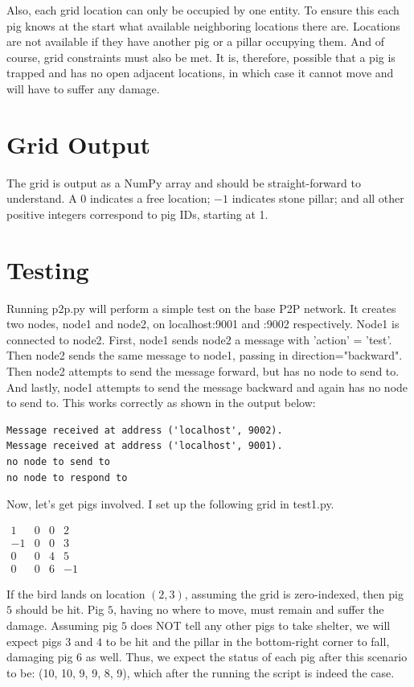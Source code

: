 \documentclass[]{article}
\begin{document}
Also, each grid location can only be occupied by one entity. To ensure this each pig knows at the start what available neighboring locations there are. Locations are not available if they have another pig or a pillar occupying them. And of course, grid constraints must also be met. It is, therefore, possible that a pig is trapped and has no open adjacent locations, in which case it cannot move and will have to suffer any damage.

\section{Grid Output}

The grid is output as a NumPy array and should be straight-forward to understand. A $0$ indicates a free location; $-1$ indicates stone pillar; and all other positive integers correspond to pig IDs, starting at 1.

\section{Testing}

Running p2p.py will perform a simple test on the base P2P network. It creates two nodes, node1 and node2, on localhost:9001 and :9002 respectively. Node1 is connected to node2. First, node1 sends node2 a message with 'action' = 'test'. Then node2 sends the same message to node1, passing in direction="backward". Then node2 attempts to send the message forward, but has no node to send to. And lastly, node1 attempts to send the message backward and again has no node to send to. This works correctly as shown in the output below:

\begin{lstlisting}
Message received at address ('localhost', 9002).
Message received at address ('localhost', 9001).
no node to send to
no node to respond to
\end{lstlisting}

Now, let's get pigs involved. I set up the following grid in test1.py.

$\begin{array}{cccc}
1 & 0 & 0 & 2 \\
-1 & 0 & 0 & 3 \\
0 & 0 & 4 & 5 \\
0 & 0 & 6 & -1
\end{array}$
 
If the bird lands on location $(2,3)$, assuming the grid is zero-indexed, then pig $5$ should be hit. Pig $5$, having no where to move, must remain and suffer the damage. Assuming pig $5$ does NOT tell any other pigs to take shelter, we will expect pigs $3$ and $4$ to be hit and the pillar in the bottom-right corner to fall, damaging pig 6 as well. Thus, we expect the status of each pig after this scenario to be: (10, 10, 9, 9, 8, 9), which after the running the script is indeed the case.
\end{document}
